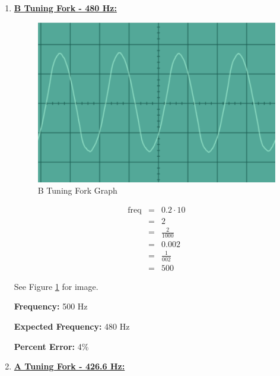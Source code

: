\documentclass[12pt,oneside]{article}
\begin{document}
\begin{enumerate}
\color{black}

\item \underline{\bf B Tuning Fork - 480 Hz:}
\color{red}

\begin{figure}[H]

{\centering \includegraphics[width=15cm,]{./images/b4} 

}

\caption{B Tuning Fork Graph}\label{fig:b4}
\end{figure}

\begin{eqnarray}
  \text{freq} & = & 0.2 \cdot 10 \\
              & = & 2 \\
              & = & \frac{2}{1000} \\
              & = & 0.002 \\
              & = & \frac{1}{002} \\
              & = & 500
\end{eqnarray}

See Figure \ref{fig:b4} for image.

\textbf{Frequency:} 500 Hz

\par

\textbf{Expected Frequency:} 480 Hz

\par

\textbf{Percent Error: } 4\%

\color{black}

\item \underline{\bf A Tuning Fork - 426.6 Hz:}
\color{red}


\end{enumerate}
\end{document}
